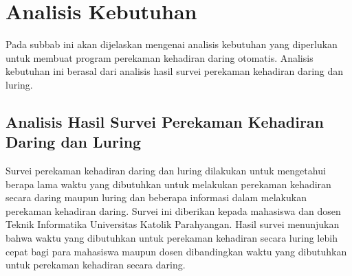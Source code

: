 \section{Analisis Kebutuhan}
Pada subbab ini akan dijelaskan mengenai analisis kebutuhan yang diperlukan untuk membuat program perekaman kehadiran daring otomatis. Analisis kebutuhan ini berasal dari analisis hasil survei perekaman kehadiran daring dan luring.

\subsection{Analisis Hasil Survei Perekaman Kehadiran Daring dan Luring}
\label{sec:survei} 
Survei perekaman kehadiran daring dan luring dilakukan untuk mengetahui berapa lama waktu yang dibutuhkan untuk melakukan perekaman kehadiran secara daring maupun luring dan beberapa informasi dalam melakukan perekaman kehadiran daring. Survei ini diberikan kepada mahasiswa dan dosen Teknik Informatika Universitas Katolik Parahyangan. Hasil survei menunjukan bahwa waktu yang dibutuhkan untuk perekaman kehadiran secara luring lebih cepat bagi para mahasiswa maupun dosen dibandingkan waktu yang dibutuhkan untuk perekaman kehadiran secara daring.

